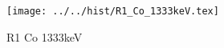 \begin{figure}[h] \centering\texttt{[image: ../../hist/R1\_Co\_1333keV.tex]}\caption{R1 Co 1333keV}\label{hist:R1_Co_1333keV} \end{figure}
